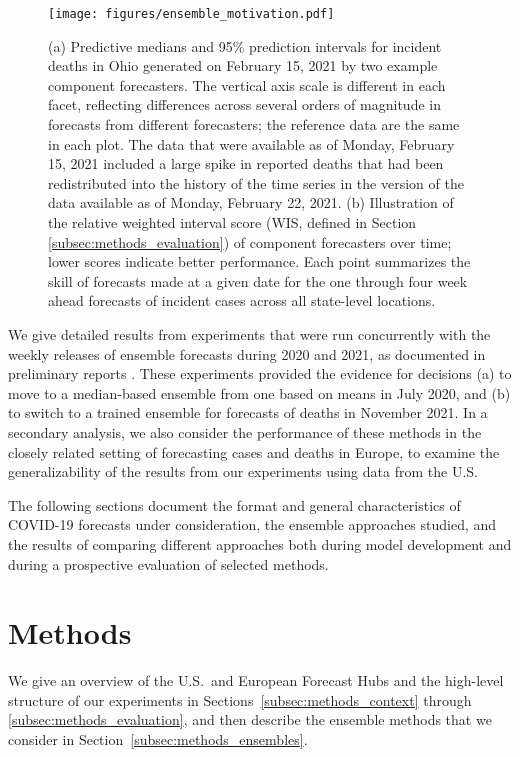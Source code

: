 \documentclass[11pt,3p,review,authoryear]{elsarticle}
\begin{document}
\begin{figure}
\centering
\texttt{[image: figures/ensemble\_motivation.pdf]}
\caption{(a) Predictive medians and 95\% prediction intervals for incident deaths in Ohio generated on February 15, 2021 by two example component forecasters. The vertical axis scale is different in each facet, reflecting differences across several orders of magnitude in forecasts from different forecasters; the reference data are the same in each plot. The data that were available as of Monday, February 15, 2021 included a large spike in reported deaths that had been redistributed into the history of the time series in the version of the data available as of Monday, February 22, 2021. (b) Illustration of the relative weighted interval score (WIS, defined in Section \ref{subsec:methods_evaluation}) of component forecasters over time; lower scores indicate better performance. Each point summarizes the skill of forecasts made at a given date for the one through four week ahead forecasts of incident cases across all state-level locations. }
\label{fig:ensemble_motivations}
\end{figure}

We give detailed results from experiments that were run concurrently with the weekly releases of ensemble forecasts during 2020 and 2021, as documented in preliminary reports \citep{2020BrooksRay_covid_ensemble_blog, 2021RayBrooks_covid_ensemble_blog}.
These experiments provided the evidence for decisions (a) to move to a median-based ensemble from one based on means in July 2020, and (b) to switch to a trained ensemble for forecasts of deaths in November 2021.
In a secondary analysis, we also consider the performance of these methods in the closely related setting of forecasting cases and deaths in Europe, to examine the generalizability of the results from our experiments using data from the U.S.

The following sections document the format and general characteristics of COVID-19 forecasts under consideration, the ensemble approaches studied, and the results of comparing different approaches both during model development and during a prospective evaluation of selected methods.

\section{Methods}

We give an overview of the U.S.\ and European Forecast Hubs and the high-level structure of our experiments in Sections~\ref{subsec:methods_context} through \ref{subsec:methods_evaluation}, and then describe the ensemble methods that we consider in Section~\ref{subsec:methods_ensembles}.
\end{document}
